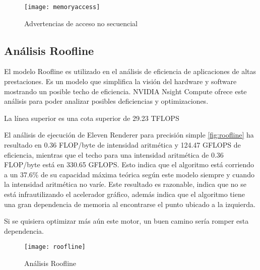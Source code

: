 \begin{figure}[H]
    \centering
	\texttt{[image: memoryaccess]}
	\caption{Advertencias de acceso no secuencial}
	\label{fig:label}
\end{figure}


\subsection{Análisis Roofline}
	
El modelo Roofline es utilizado en el análisis de eficiencia de aplicaciones de altas prestaciones. Es un modelo que simplifica la visión del hardware y software mostrando un posible techo de eficiencia. NVIDIA Nsight Compute ofrece este análisis para poder analizar posibles deficiencias y optimizaciones.

La línea superior es una cota superior de 29.23 TFLOPS

El análisis de ejecución de Eleven Renderer para precisión simple \autoref{fig:roofline} ha resultado en 0.36 FLOP/byte de intensidad aritmética y 124.47 GFLOPS de eficiencia, mientras que el techo para una intensidad aritmética de 0.36 FLOP/byte está en 330.65 GFLOPS. Esto indica que el algoritmo está corriendo a un 37.6\% de su capacidad máxima teórica según este modelo siempre y cuando la intensidad aritmética no varíe. Este resultado es razonable, indica que no se está infrautilizando el acelerador gráfico, además indica que el algoritmo tiene una gran dependencia de memoria al encontrarse el punto ubicado a la izquierda.

Si se quisiera optimizar más aún este motor, un buen camino sería romper esta dependencia.

\begin{figure}[H]
    \centering
	\texttt{[image: roofline]}
	\caption{Análisis Roofline}
	\label{fig:roofline}
\end{figure}


